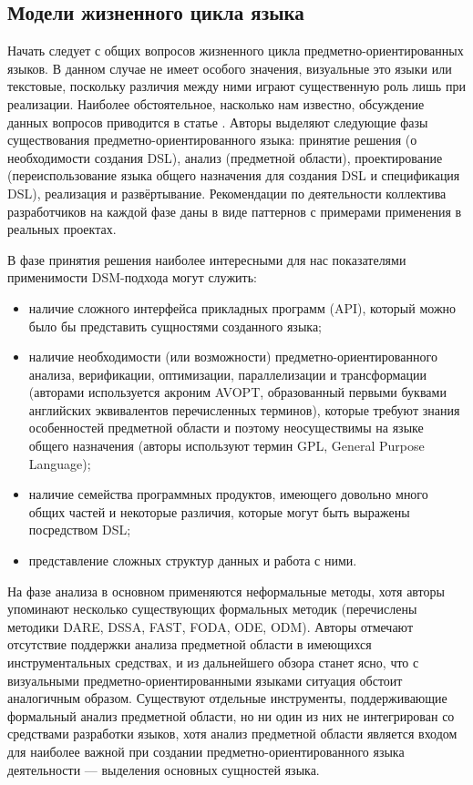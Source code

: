 \subsection{Модели жизненного цикла языка}
\label{lifecycleModels}
Начать следует с общих вопросов жизненного цикла предметно-ориентированных языков.
В данном случае не имеет особого значения, визуальные это языки или текстовые, поскольку
различия между ними играют существенную роль лишь при реализации. Наиболее обстоятельное,
насколько нам известно, обсуждение данных вопросов приводится в статье \cite{mernik2005and}. 
Авторы выделяют следующие фазы существования предметно-ориентированного языка: принятие 
решения (о необходимости создания DSL), анализ (предметной области), проектирование 
(переиспользование языка общего назначения для создания DSL и спецификация DSL), реализация 
и развёртывание. Рекомендации по деятельности коллектива разработчиков на каждой фазе 
даны в виде паттернов с примерами применения в реальных проектах. 

В фазе принятия решения наиболее интересными для нас показателями применимости \ac{DSM}-подхода могут служить: 
\begin{itemize}
	\item наличие сложного интерфейса прикладных программ (\ac{API}), который можно было 
		бы представить сущностями созданного языка;
	\item наличие необходимости (или возможности) предметно-ориентированного анализа, 
		верификации, оптимизации, параллелизации и трансформации (авторами используется 
		акроним AVOPT, образованный первыми буквами английских эквивалентов перечисленных 
		терминов), которые требуют знания особенностей предметной области и поэтому неосуществимы 
		на языке общего назначения (авторы используют термин GPL, General Purpose Language);
	\item наличие семейства программных продуктов, имеющего довольно много общих частей 
		и некоторые различия, которые могут быть выражены посредством DSL;
	\item представление сложных структур данных и работа с ними.
\end{itemize}

На фазе анализа в основном применяются неформальные методы, хотя авторы упоминают 
несколько существующих формальных методик (перечислены методики DARE, DSSA, FAST, 
FODA, ODE, ODM). Авторы отмечают отсутствие поддержки анализа предметной 
области в имеющихся инструментальных средствах, и из дальнейшего обзора станет ясно, 
что с визуальными предметно-ориентированными языками ситуация обстоит аналогичным 
образом. Существуют отдельные инструменты, поддерживающие формальный анализ предметной 
области, но ни один из них не интегрирован со средствами разработки языков, хотя анализ 
предметной области является входом для наиболее важной при создании предметно-ориентированного 
языка деятельности --- выделения основных сущностей языка.

